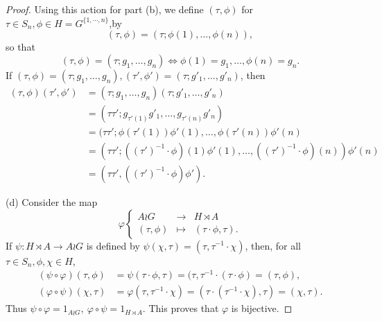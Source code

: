 \documentclass[11pt,a4paper]{article}
\begin{document}
\begin{proof}
Using this action for part (b), we define $(\tau, \phi)$ for $\tau \in S_n, \phi \in H = G^{\{1,\cdots,n\}}$,by
$$(\tau, \phi) = (\tau; \phi(1),\ldots,\phi(n)),$$
so that
$$(\tau, \phi) = (\tau; g_1,\ldots,g_n) \iff  \phi(1) = g_1,\ldots,\phi(n) = g_n.$$
If $(\tau, \phi) = (\tau; g_1,\ldots,g_n), (\tau', \phi') = (\tau; g'_1,\ldots,g'_n)$, then
\begin{align*}
(\tau, \phi) (\tau', \phi') &= (\tau; g_1,\ldots,g_n)(\tau; g'_1,\ldots,g'_n)\\
&=(\tau \tau'; g_{\tau'(1)}g'_1,\ldots,g_{\tau'(n)} g'_n) \\
&=(\tau \tau'; \phi(\tau'(1))\phi'(1),\ldots,\phi(\tau'(n)) \phi'(n)\\
&=(\tau \tau'; ((\tau')^{-1}\cdot\phi)(1)\phi'(1),\ldots,((\tau')^{-1}\cdot\phi)(n))\phi'(n)\\
&= (\tau \tau', ((\tau')^{-1}\cdot\phi)\phi').
\end{align*}

\item[(d)] Consider the map
$$
\varphi
\left\{
\begin{array}{ccc}
A \wr G & \to & H \rtimes A\\
(\tau,\phi) & \mapsto & (\tau\cdot \phi, \tau).
\end{array}
\right.
$$
If $\psi : H \rtimes A \to A \wr G$ is defined by $\psi(\chi, \tau) = (\tau, \tau^{-1} \cdot \chi)$, then, for all $\tau \in S_n, \phi,\chi \in H$,
\begin{align*}
(\psi \circ \varphi)(\tau, \phi) &= \psi(\tau\cdot \phi, \tau) = (\tau, \tau^{-1}\cdot (\tau \cdot \phi) = (\tau, \phi),\\
(\varphi \circ \psi)(\chi, \tau) &= \varphi(\tau, \tau^{-1} \cdot \chi) = (\tau \cdot (\tau^{-1} \cdot \chi), \tau) = (\chi, \tau). 
\end{align*}
Thus $\psi \circ \varphi = 1_{A \wr G},\  \varphi \circ \psi = 1_{H \rtimes A}$. This proves that $\varphi$ is bijective.


\end{proof}
\end{document}
